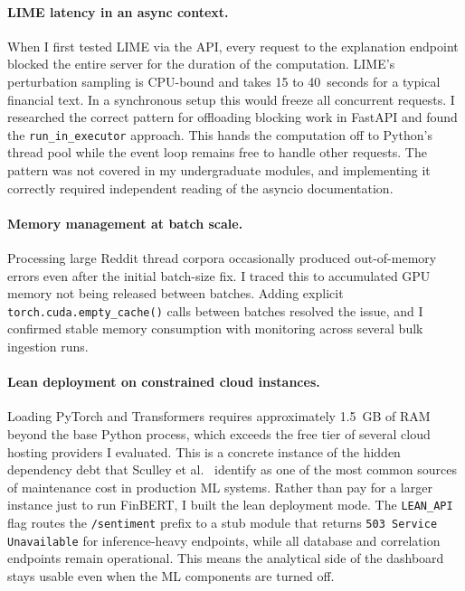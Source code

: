 \paragraph{LIME latency in an async context.}
When I first tested LIME via the API, every request to the explanation endpoint blocked the entire server for the duration of the computation. LIME's perturbation sampling is CPU-bound and takes 15 to 40~seconds for a typical financial text. In a synchronous setup this would freeze all concurrent requests. I researched the correct pattern for offloading blocking work in FastAPI and found the \texttt{run\_in\_executor} approach. This hands the computation off to Python's thread pool while the event loop remains free to handle other requests. The pattern was not covered in my undergraduate modules, and implementing it correctly required independent reading of the asyncio documentation.

\paragraph{Memory management at batch scale.}
Processing large Reddit thread corpora occasionally produced out-of-memory errors even after the initial batch-size fix. I traced this to accumulated GPU memory not being released between batches. Adding explicit \texttt{torch.cuda.empty\_cache()} calls between batches resolved the issue, and I confirmed stable memory consumption with monitoring across several bulk ingestion runs.

\paragraph{Lean deployment on constrained cloud instances.}
Loading PyTorch and Transformers requires approximately 1.5~GB of RAM beyond the base Python process, which exceeds the free tier of several cloud hosting providers I evaluated. This is a concrete instance of the hidden dependency debt that Sculley et al.\ \citep{sculley2015debt} identify as one of the most common sources of maintenance cost in production ML systems. Rather than pay for a larger instance just to run FinBERT, I built the lean deployment mode. The \texttt{LEAN\_API} flag routes the \texttt{/sentiment} prefix to a stub module that returns \texttt{503 Service Unavailable} for inference-heavy endpoints, while all database and correlation endpoints remain operational. This means the analytical side of the dashboard stays usable even when the ML components are turned off.

